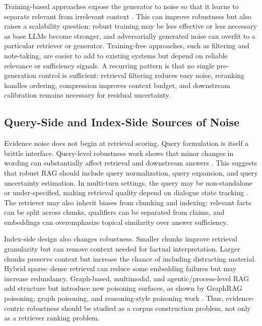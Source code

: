 \documentclass[11pt]{article}
\begin{document}
Training-based approaches expose the generator to noise so that it learns to separate relevant from irrelevant context \citep{raat2024,rrag091}. This can improve robustness but also raises a scalability question: robust training may be less effective or less necessary as base LLMs become stronger, and adversarially generated noise can overfit to a particular retriever or generator. Training-free approaches, such as filtering and note-taking, are easier to add to existing systems but depend on reliable relevance or sufficiency signals. A recurring pattern is that no single pre-generation control is sufficient: retrieval filtering reduces easy noise, reranking handles ordering, compression improves context budget, and downstream calibration remains necessary for residual uncertainty.

\subsection{Query-Side and Index-Side Sources of Noise}

Evidence noise does not begin at retrieval scoring. Query formulation is itself a brittle interface. Query-level robustness work shows that minor changes in wording can substantially affect retrieval and downstream answers \citep{queryRobustness2025}. This suggests that robust RAG should include query normalization, query expansion, and query uncertainty estimation. In multi-turn settings, the query may be non-standalone or under-specified, making retrieval quality depend on dialogue state tracking \citep{rrag141}. The retriever may also inherit biases from chunking and indexing: relevant facts can be split across chunks, qualifiers can be separated from claims, and embeddings can overemphasize topical similarity over answer sufficiency.

Index-side design also changes robustness. Smaller chunks improve retrieval granularity but can remove context needed for factual interpretation. Larger chunks preserve context but increase the chance of including distracting material. Hybrid sparse--dense retrieval can reduce some embedding failures but may increase redundancy. Graph-based, multimodal, and agentic/process-level RAG add structure but introduce new poisoning surfaces, as shown by GraphRAG poisoning, graph poisoning, and reasoning-style poisoning work \citep{rrag051,rrag127,rrag175}. Thus, evidence-centric robustness should be studied as a corpus construction problem, not only as a retriever ranking problem.
\end{document}
